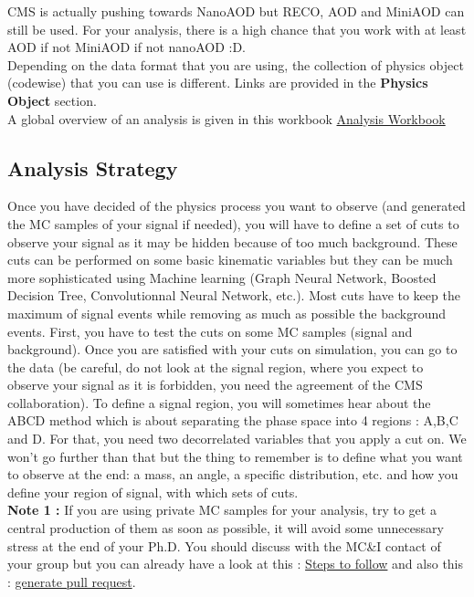 \documentclass[reprint, a4paper, nofootinbib, amsmath, amssymb, aps]{revtex4-1}
\begin{document}
    CMS is actually pushing towards NanoAOD but RECO, AOD and MiniAOD can still be used. For your analysis, there is a high chance that you work with at least AOD if not MiniAOD if not nanoAOD :D. \\
    Depending on the data format that you are using, the collection of physics object (codewise) that you can use is different. Links are provided in the \textbf{Physics Object} section.\\

    A global overview of an analysis is given in this workbook \href{https://twiki.cern.ch/twiki/bin/view/CMSPublic/WorkBook}{Analysis Workbook}\\
        
    
\subsection{Analysis Strategy}
    Once you have decided of the physics process you want to observe (and generated the MC samples of your signal if needed), you will have to define a set of cuts to observe your signal as it may be hidden because of too much background. These cuts can be performed on some basic kinematic variables but they can be much more sophisticated using Machine learning (Graph Neural Network, Boosted Decision Tree, Convolutionnal Neural Network, etc.). Most cuts have to keep the maximum of signal events while removing as much as possible the background events. First, you have to test the cuts on some MC samples (signal and background). Once you are satisfied with your cuts on simulation, you can go to the data (be careful, do not look at the signal region, where you expect to observe your signal as it is forbidden, you need the agreement of the CMS collaboration). To define a signal region, you will sometimes hear about the ABCD method which is about separating the phase space into 4 regions : A,B,C and D. For that, you need two decorrelated variables that you apply a cut on.
    We won't go further than that but the thing to remember is to define what you want to observe at the end: a mass, an angle, a specific distribution, etc. and how you define your region of signal, with which sets of cuts.\\
    \textbf{Note 1 :} If you are using private MC samples for your analysis, try to get a central production of them as soon as possible, it will avoid some unnecessary stress at the end of your Ph.D. You should discuss with the MC\&I contact of your group but you can already have a look at this : \href{https://cms-pdmv.gitbook.io/project/mccontact#preliminary-steps}{Steps to follow} and also this : \href{https://twiki.cern.ch/twiki/bin/viewauth/CMS/GitRepositoryForGenProduction}{generate pull request}.
    
\end{document}
